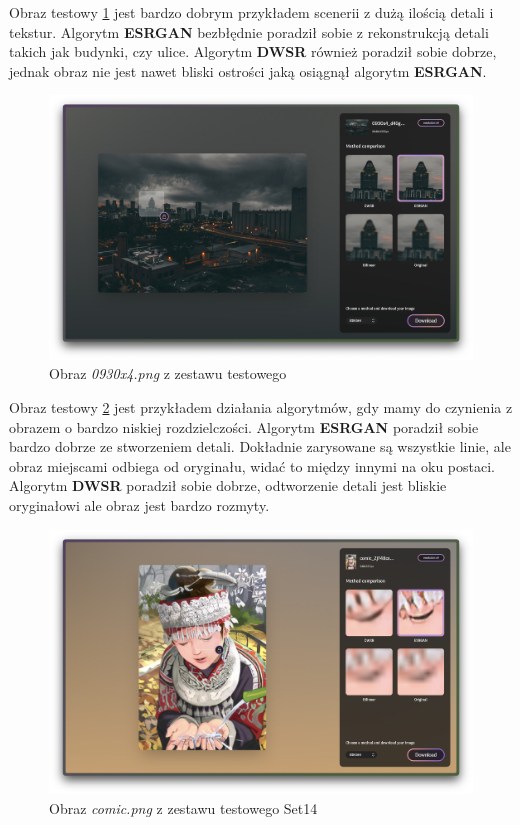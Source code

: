 Obraz testowy \ref{fig:image103} jest bardzo dobrym przykładem scenerii z dużą ilością detali i tekstur. Algorytm \textbf{ESRGAN} bezbłędnie poradził sobie z rekonstrukcją detali takich jak budynki, czy ulice. Algorytm \textbf{DWSR} również poradził sobie dobrze, jednak obraz nie jest nawet bliski ostrości jaką osiągnął algorytm \textbf{ESRGAN}.

\begin{figure}[H]
    \centering
    \includegraphics[width=0.9\linewidth]{Rozdziały/05.Porownanie_algorytmow/Obrazy/Zrzut ekranu 2023-12-12 o 14.12.20.jpg}  
    \caption{Obraz \textit{0930x4.png} z zestawu testowego \cite{guo2017deep}}
    \label{fig:image103}
\end{figure}

Obraz testowy \ref{fig:image104} jest przykładem działania algorytmów, gdy mamy do czynienia z obrazem o bardzo niskiej rozdzielczości. Algorytm \textbf{ESRGAN} poradził sobie bardzo dobrze ze stworzeniem detali. Dokładnie zarysowane są wszystkie linie, ale obraz miejscami odbiega od oryginału, widać to między innymi na oku postaci. Algorytm \textbf{DWSR} poradził sobie dobrze, odtworzenie detali jest bliskie oryginałowi ale obraz jest bardzo rozmyty.


\begin{figure}[H]
    \centering
    \includegraphics[width=0.9\linewidth]{Rozdziały/05.Porownanie_algorytmow/Obrazy/Zrzut ekranu comic.jpg}  
    \caption{Obraz \textit{comic.png} z zestawu testowego Set14 \cite{zeyde2010single}}
    \label{fig:image104}
\end{figure}

